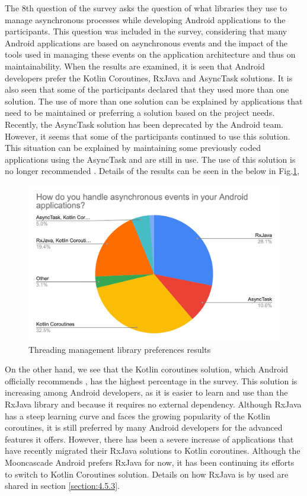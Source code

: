 The 8th question of the survey asks the question of what libraries they use to manage asynchronous processes while developing Android applications to the participants. This question was included in the survey, considering that many Android applications are based on asynchronous events and the impact of the tools used in managing these events on the application architecture and thus on maintainability. When the results are examined, it is seen that Android developers prefer the Kotlin Coroutines, RxJava and AsyncTask solutions. It is also seen that some of the participants declared that they used more than one solution. The use of more than one solution can be explained by applications that need to be maintained or preferring a solution based on the project needs. Recently, the AsyncTask solution has been deprecated by the Android team. However, it seems that some of the participants continued to use this solution. This situation can be explained by maintaining some previously coded applications using the AsyncTask and are still in use. The use of this solution is no longer recommended \cite{30}. Details of the results can be seen in the below in Fig.\ref{fig:async_events},
\begin{figure}[ht!]
    \centering
    \includegraphics[scale=0.25]{figures/async_events.png}
    \caption{Threading management library preferences results}
    \label{fig:async_events}
\end{figure}
\FloatBarrier

On the other hand, we see that the Kotlin coroutines solution, which Android officially recommends \cite{31}, has the highest percentage in the survey. This solution is increasing among Android developers, as it is easier to learn and use than the RxJava library and because it requires no external dependency. Although RxJava has a steep learning curve and faces the growing popularity of the Kotlin coroutines, it is still preferred by many Android developers for the advanced features it offers. However, there has been a severe increase of applications that have recently migrated their RxJava solutions to Kotlin coroutines\cite{42}. Although the Mooncascade Android prefers RxJava for now, it has been continuing its efforts to switch to Kotlin Coroutines solution. Details on how RxJava is by used are shared in section \ref{section:4.5.3}.

